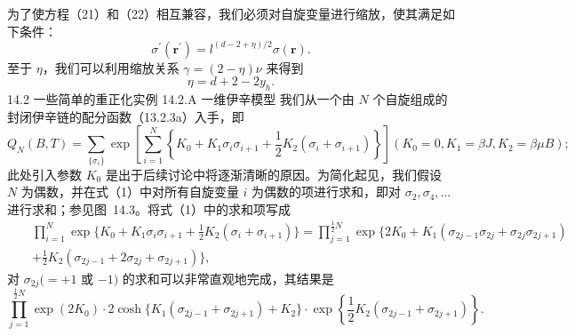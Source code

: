 为了使方程（21）和（22）相互兼容，我们必须对自旋变量进行缩放，使其满足如下条件：
\begin{equation}\tag{14.1.23}\label{eq:14.1.23}
\sigma ^{\prime} ( \boldsymbol { r } ^{\prime} ) = l ^{( d - 2 + \eta ) / 2} \sigma ( \boldsymbol { r } ) .
\end{equation}
至于 \(\eta\)，我们可以利用缩放关系 \(\gamma = (2 - \eta)\nu\) 来得到
\begin{equation}\tag{14.1.24}\label{eq:14.1.24}
\eta = d + 2 - 2 y _ { h } .
\end{equation}
14.2 一些简单的重正化实例
14.2.A 一维伊辛模型
我们从一个由 \(N\) 个自旋组成的封闭伊辛链的配分函数（13.2.3a）入手，即
\begin{equation}\tag{14.2.1}\label{eq:14.2.1}
Q _ { N } ( B , T ) = \sum _ { \{ \sigma _ { i } \} } \exp \left[ \sum _ { i = 1 } ^{N} \left\{ K _ { 0 } + K _ { 1 } \sigma _ { i } \sigma _ { i + 1 } + \frac { 1 } { 2 } K _ { 2 } ( \sigma _ { i } + \sigma _ { i + 1 } ) \right\} \right]   ( K _ { 0 } = 0 , K _ { 1 } = \beta J , K _ { 2 } = \beta \mu B ) ;
\end{equation}
此处引入参数 \(K_{0}\) 是出于后续讨论中将逐渐清晰的原因。为简化起见，我们假设 \(N\) 为偶数，并在式（1）中对所有自旋变量 \(i\) 为偶数的项进行求和，即对 \(\sigma_{2}, \sigma_{4}, \ldots\) 进行求和；参见图~14.3。将式（1）中的求和项写成
\begin{equation}\tag{14.2.2}\label{eq:14.2.2}
\begin{array}{rlr} & { } & { \displaystyle \prod _ { i = 1 } ^{N} \exp \{ K _ { 0 } + K _ { 1 } \sigma _ { i } \sigma _ { i + 1 } + \frac { 1 } { 2 } K _ { 2 } ( \sigma _ { i } + \sigma _ { i + 1 } ) \} = \displaystyle \prod _ { j = 1 } ^{\frac { 1} { 2 } N } \exp \{ 2 K _ { 0 } + K _ { 1 } ( \sigma _ { 2 j - 1 } \sigma _ { 2 j } + \sigma _ { 2 j } \sigma _ { 2 j + 1 } ) } \\& { } & {   + \frac { 1 } { 2 } K _ { 2 } ( \sigma _ { 2 j - 1 } + 2 \sigma _ { 2 j } + \sigma _ { 2 j + 1 } ) \} , } \end{array}
\end{equation}
对 \(\sigma_{2j}(=+1\) 或 \(-1)\) 的求和可以非常直观地完成，其结果是
\begin{equation}\tag{14.2.3}\label{eq:14.2.3}
\prod _ { j = 1 } ^{\frac { 1} { 2 } N } \exp ( 2 K _ { 0 } ) \cdot 2 \cosh \{ K _ { 1 } ( \sigma _ { 2 j - 1 } + \sigma _ { 2 j + 1 } ) + K _ { 2 } \} \cdot \exp \left\{ \frac { 1 } { 2 } K _ { 2 } ( \sigma _ { 2 j - 1 } + \sigma _ { 2 j + 1 } ) \right\} .
\end{equation}
